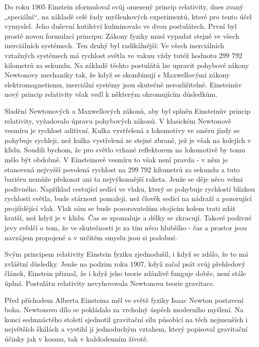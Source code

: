   Do roku 1905 Einstein zformuloval svůj omezený princip relativity, dnes zvaný „speciální“, na
  základě celé řady myšlenkových experimentů, které pro tento účel vymyslel. Jeho duševní kutilství
  kulminovalo ve dvou postulátech. První byl prostě novou formulací principu: Zákony fyziky musí
  vypadat stejně ve všech inerciálních systémech. Ten druhý byl radikálnější: Ve všech inerciálních
  vztažných systémech má rychlost světla ve vakuu vždy tutéž hodnotu 299 792 kilometrů za sekundu.
  Na základě těchto postulátů lze upravit pohybové zákony Newtonovy mechaniky tak, že když se
  skombinují s Maxwellovými zákony elektromagnetismu, inerciální systémy jsou skutečně
  nerozlišitelné. Einsteinův nový princip relativity však vedl k některým ohromujícím důsledkům. 

  Sladění Newtonových a Maxwellových zákonů, aby byl splněn Einsteinův princip relativity,
  vyžadovalo úpravu pohybových zákonů. V klasickém Newtonově vesmíru je rychlost aditivní. Kulka
  vystřelená z lokomotivy ve směru jízdy se pohybuje rychleji, než kulka vystřelená ze stejné
  zbraně, jež je však na kolejích v klidu. Soudili bychom, že pro světlo vrhané reflektorem na
  lokomotivě by tomu mělo být obdobně. V Einsteinově vesmíru to však není pravda - v něm je
  stanovená nejvyšší povolená rychlost na 299 792 kilometrů za sekundu a tuto bariéru nemůže
  překonat ani ta nejvýkonnější raketa. Jenže se děje něco velmi podivného. Například cestující
  sedící ve vlaku, který se pohybuje rychlostí blízkou rychlosti světla, bude stárnout pomaleji, než
  člověk sedící na nádraží a pozorující projíždějící vlak. Vlak sám se bude pozorovatelům stojícím
  kolem trati zdát kratší, než když je v klidu. Čas se zpomaluje a délky se zkracují. Takové podivné
  jevy svědčí o tom, že ve skutečnosti je za tím něco hlubšího - čas a prostor jsou navzájem
  propojené a v určitém smyslu jsou si podobné. 

  Svým principem relativity Einstein fyziku zjednodušil, i když se zdálo, že to má zvláštní
  důsledky. Jenže na podzim roku 1907, když začal psát svůj přehledový článek, Einstein přiznal, že
  i když jeho teorie zdánlivě funguje dobře, není stále úplná. Postulátu relativity nevyhovovala
  Newtonova teorie gravitace.

  Před příchodem Alberta Einsteina měl ve světě fyziky Isaac Newton postavení boha. Newtonovo dílo
  se pokládalo za vrcholný úspěch moderního myšlení. Na konci sedmnáctého století sjednotil
  gravitační sílu působící na těch nejmenších i největších škálách a vystihl ji jednoduchým vztahem,
  který popisoval gravitační účinky jak v kosmu, tak v každodenním životě. 
  
